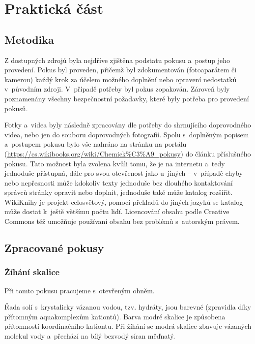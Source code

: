 \chapter{Praktická část}

\section{Metodika}
Z dostupných zdrojů byla nejdříve zjištěna podstatu pokusu a~postup jeho provedení. Pokus byl proveden, přičemž byl zdokumentován (fotoaparátem či kamerou) každý krok za účelem možného doplnění nebo opravení nedostatků v~původním zdroji. V~případě potřeby byl pokus zopakován. Zároveň byly poznamenány všechny bezpečnostní požadavky, které byly potřeba pro provedení pokusů.

Fotky a~videa byly následně zpracovány dle potřeby do shrnujícího doprovodného videa, nebo jen do souboru doprovodných fotografií. Spolu s~doplněným popisem a~postupem pokusu bylo vše nahráno na stránku  na portálu  (\url{https://cs.wikibooks.org/wiki/Chemick%C3%A9_pokusy}) do článku příslušného pokusu. Tato možnost byla zvolena kvůli tomu, že je na internetu a~tedy jednoduše přístupná, dále pro svou otevřenost jako u~jiných \uv{wiki projektů} -- v~případě chyby nebo nepřesnosti může kdokoliv texty jednoduše bez dlouhého kontaktování správců stránky opravit nebo doplnit, jednoduše také může katalog rozšířit. WikiKnihy je projekt celosvětový, pomocí překladů do jiných jazyků se katalog může dostat k~ještě většímu počtu lidí. Licencování obsahu podle Creative Commons též umožňuje používaní obsahu bez problémů s~autorským právem.


\section{Zpracované pokusy}
\subsection{Žíhání skalice}


Při tomto pokusu pracujeme s~otevřeným ohněm.

\hspace{-21pt} 

Řada solí s~krystalicky vázanou vodou, tzv. hydráty, jsou barevné (zpravidla díky přítomným aquakomplexům kationtů). Barva modré skalice je způsobena přítomností koordinačního kationtu. Při žíhání se modrá skalice zbavuje vázaných molekul vody a~přechází na bílý bezvodý síran měďnatý.

